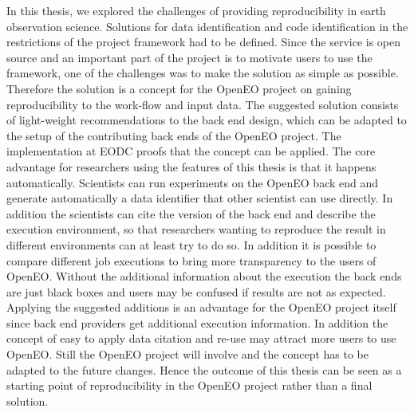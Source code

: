 \documentclass[draft,final]{vutinfth} %
\begin{document}
In this thesis, we explored the challenges of providing reproducibility in earth observation science. Solutions for data identification and code identification in the restrictions of the project framework had to be defined. Since the service is open source and an important part of the project is to motivate users to use the framework, one of the challenges was to make the solution as simple as possible. Therefore the solution is a concept for the OpenEO project on gaining reproducibility to the work-flow and input data. The suggested solution consists of light-weight recommendations to the back end design, which can be adapted to the setup of the contributing back ends of the OpenEO project. The implementation at EODC proofs that the concept can be applied. The core advantage for researchers using the features of this thesis is that it happens automatically. Scientists can run experiments on the OpenEO back end and generate automatically a data identifier that other scientist can use directly. In addition the scientists can cite the version of the back end and describe the execution environment, so that researchers wanting to reproduce the result in different environments can at least try to do so. In addition it is possible to compare different job executions to bring more transparency to the users of OpenEO. Without the additional information about the execution the back ends are just black boxes and users may be confused if results are not as expected. Applying the suggested additions is an advantage for the OpenEO project itself since back end providers get additional execution information. In addition the concept of easy to apply data citation and re-use may attract more users to use OpenEO. Still the OpenEO project will involve and the concept has to be adapted to the future changes. Hence the outcome of this thesis can be seen as a starting point of reproducibility in the OpenEO project rather than a final solution.  
\end{document}

